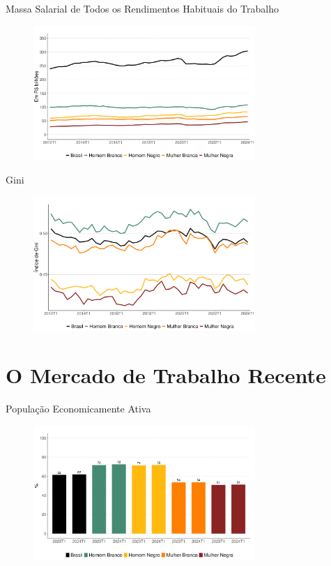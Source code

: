 \documentclass[10pt, xcolor=x11names,compress]{beamer}
\begin{document}
	
	\begin{frame}{Massa Salarial de Todos os Rendimentos Habituais do Trabalho}
		\begin{figure}
			\centering
			\includegraphics[width = 0.75\textwidth]{figures_output/massa_habitual_br_gen_raca.pdf}
		\end{figure}
	\end{frame}
	
	
	\begin{frame}{Gini}
		\begin{figure}
			\centering
			\includegraphics[width = 0.75\textwidth]{figures_output/gini_br_gen_raca.pdf}
		\end{figure}
	\end{frame}
	
	\section{O Mercado de Trabalho Recente}
	\begin{frame}{População Economicamente Ativa}
		\begin{figure}
			\centering
			\includegraphics[width = 0.75\textwidth]{figures_output/pea.pdf}
		\end{figure}
	\end{frame}			
	
\end{document}
